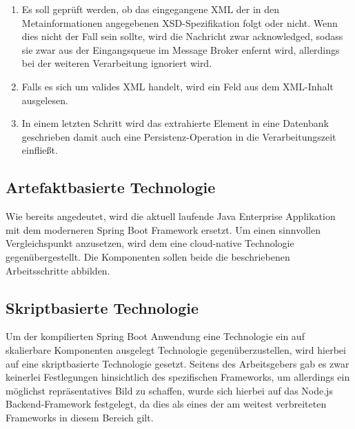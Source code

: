\begin{enumerate}

  \item Es soll geprüft werden, ob das eingegangene XML der in den Metainformationen angegebenen XSD-Spezifikation folgt oder nicht. Wenn dies nicht der Fall sein sollte, wird die Nachricht zwar acknowledged, sodass sie zwar aus der Eingangsqueue im Message Broker enfernt wird, allerdings bei der weiteren Verarbeitung ignoriert wird.

  \item Falls es sich um valides XML handelt, wird ein Feld aus dem XML-Inhalt ausgelesen.

  \item In einem letzten Schritt wird das extrahierte Element in eine Datenbank geschrieben damit auch eine Persistenz-Operation in die Verarbeitungszeit einfließt.

\end{enumerate}

\subsection{Artefaktbasierte Technologie \checkmark}
Wie bereits angedeutet, wird die aktuell laufende Java Enterprise Applikation mit dem moderneren Spring Boot Framework ersetzt. Um einen sinnvollen Vergleichspunkt anzusetzen, wird dem eine cloud-native Technologie gegenübergestellt. Die Komponenten sollen beide die beschriebenen Arbeitsschritte abbilden.

\subsection{Skriptbasierte Technologie \checkmark}


Um der kompilierten Spring Boot Anwendung eine Technologie ein auf skalierbare Komponenten ausgelegt Technologie gegenüberzustellen, wird hierbei auf eine skriptbasierte Technologie gesetzt. Seitens des Arbeitsgebers gab es zwar keinerlei Festlegungen hinsichtlich des spezifischen Frameworks, um allerdings ein möglichst repräsentatives Bild zu schaffen, wurde sich hierbei auf das Node.js Backend-Framework festgelegt, da dies als eines der am weitest verbreiteten Frameworks in diesem Bereich gilt.

